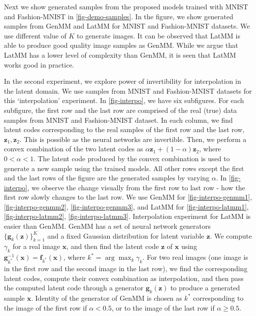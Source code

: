 Next we show generated samples from the proposed models trained with MNIST and Fashion-MNIST in \autoref{fig-demo-samples}. In the figure, we show generated samples from GenMM and LatMM for MNIST and Fashion-MNIST datasets. We use different value of $K$ to generate images. It can be observed that LatMM is able to produce good quality image samples as GenMM. While we argue that LatMM has a lower level of complexity than GenMM, it is seen that LatMM works good in practice.    

In the second experiment, we explore power of invertibility for interpolation in the latent domain. We use samples from MNIST and Fashion-MNIST datasets for this `interpolation' experiment. In \autoref{fig-interpo}, we have six subfigures. For each subfigure, the first row and the last row are comprised of the real (true) data samples from MNIST and Fashion-MNIST dataset. In each column, we find latent codes corresponding to the real samples of the first row and the last row, $\bm{z}_1, \bm{z}_2$. This is possible as the neural networks are invertible. Then, we perform a convex combination of the two latent codes as $\alpha \bm{z}_1 + (1- \alpha)\bm{z}_2$, where $0 < \alpha <1$. The latent code produced by the convex combination is used to generate a new sample using the trained models. All other rows except the first and the last rows of the figure are the generated samples by varying $\alpha$. In \autoref{fig-interpo}, we observe the change visually from the first row to last row - how the first row slowly changes to the last row. We use GenMM for \autoref{fig-interpo-genmm1}, \autoref{fig-interpo-genmm2}, \autoref{fig-interpo-genmm3}, and LatMM for \autoref{fig-interpo-latmm1}, \autoref{fig-interpo-latmm2}, \autoref{fig-interpo-latmm3}. Interpolation experiment for LatMM is easier than GenMM. GenMM has a set of neural network generators $\{ \bm{g}_k(\bm{z}) \}_{k=1}^K$ and a fixed Gaussian distribution for latent variable $\bm{z}$. We compute $\gamma_k$ for a real image $\bm{x}$, and then find the latent code $\bm{z}$ of $\bm{x}$ using $\bm{g}_{k^{*}}^{-1}(\bm{x})=\bm{f}_{k^{*}}(\bm{x})$, where $k^{*} = \arg \max_{k} \gamma_k$. For two real images (one image is in the first row and the second image in the last row), we find the corresponding latent codes, compute their convex combination as interpolation, and then pass the computed latent code through a generator $\bm{g}_k(\bm{z})$ to produce a generated sample $\bm{x}$. Identity of the generator of GenMM is chosen as $k^{*}$ corresponding to the image of the first row if $\alpha < 0.5$, or to the image of the last row if $\alpha \geq 0.5$.

